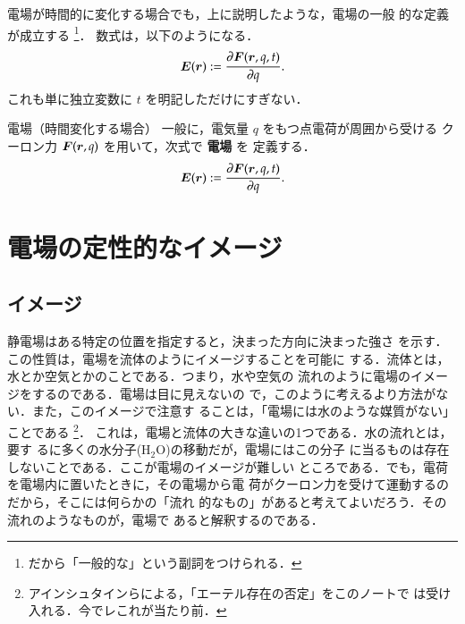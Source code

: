                 電場が時間的に変化する場合でも，上に説明したような，電場の一般
                的な定義が成立する
                    \footnote{
                        だから「一般的な」という副詞をつけられる．
                    }．
                数式は，以下のようになる．
                    \begin{align}\label{denba_teigi_3}
                        \bE(\br)
                        :=\frac{\rd\bF(\br, q, t)}{\rd q}.
                    \end{align}
                これも単に独立変数に $t$ を明記しただけにすぎない．
                \begin{myshadebox}{電場（時間変化する場合）}
                一般に，電気量 $q$ をもつ点電荷が周囲から受ける
                クーロン力 $\boldsymbol{F}(\boldsymbol{r},q)$ を用いて，次式で \textbf{電場} を
                定義する．
                    \begin{align}\label{denba_teigi_4_t}
                        \bE(\br)
                        :=\frac{\rd\bF(\br,q, t)}{\rd q}.
                    \end{align}
                \end{myshadebox}


            \section{電場の定性的なイメージ}
        \subsection{イメージ}
                静電場はある特定の位置を指定すると，決まった方向に決まった強さ
                を示す．この性質は，電場を流体のようにイメージすることを可能に
                する．流体とは，水とか空気とかのことである．つまり，水や空気の
                流れのように電場のイメージをするのである．電場は目に見えないの
                で，このように考えるより方法がない．また，このイメージで注意す
                ることは，「電場には水のような媒質がない」ことである
                     \footnote{
                        アインシュタインらによる，「エーテル存在の否定」をこのノートで
                        は受け入れる．今でレこれが当たり前．
                     }．
                これは，電場と流体の大きな違いの1つである．水の流れとは，要す
                るに多くの水分子($\mathrm{H_{2}O}$)の移動だが，電場にはこの分子
                に当るものは存在しないことである．ここが電場のイメージが難しい
                ところである．でも，電荷を電場内に置いたときに，その電場から電
                荷がクーロン力を受けて運動するのだから，そこには何らかの「流れ
                的なもの」があると考えてよいだろう．その流れのようなものが，電場で
                あると解釈するのである．

